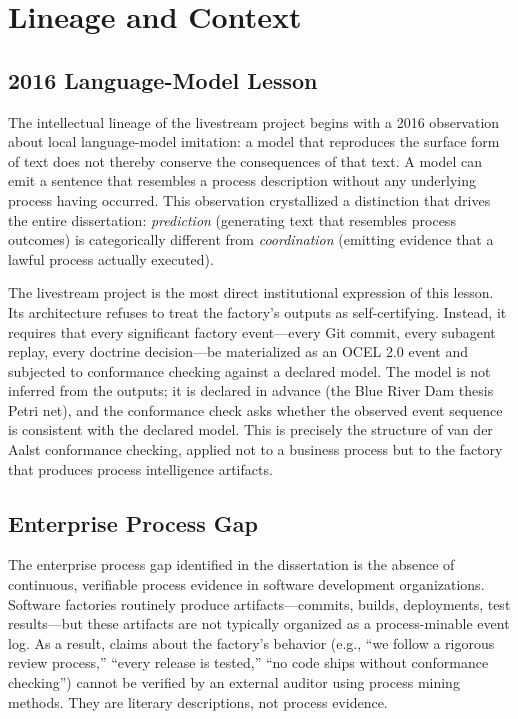 
\section{Lineage and Context}
\label{sec:livestream-lineage}

\subsection{2016 Language-Model Lesson}
\label{sec:livestream-lineage-2016}

The intellectual lineage of the livestream project begins with a 2016 observation
about local language-model imitation: a model that reproduces the surface form of
text does not thereby conserve the consequences of that text. A model can emit a
sentence that resembles a process description without any underlying process having
occurred. This observation crystallized a distinction that drives the entire
dissertation: \emph{prediction} (generating text that resembles process outcomes)
is categorically different from \emph{coordination} (emitting evidence that a
lawful process actually executed).

The livestream project is the most direct institutional expression of this lesson.
Its architecture refuses to treat the factory's outputs as self-certifying. Instead,
it requires that every significant factory event---every Git commit, every subagent
replay, every doctrine decision---be materialized as an OCEL 2.0 event and subjected
to conformance checking against a declared model. The model is not inferred from
the outputs; it is declared in advance (the Blue River Dam thesis Petri net), and
the conformance check asks whether the observed event sequence is consistent with
the declared model. This is precisely the structure of van der Aalst conformance
checking, applied not to a business process but to the factory that produces
process intelligence artifacts.

\subsection{Enterprise Process Gap}
\label{sec:livestream-lineage-enterprise-gap}

The enterprise process gap identified in the dissertation is the absence of
continuous, verifiable process evidence in software development organizations.
Software factories routinely produce artifacts---commits, builds, deployments,
test results---but these artifacts are not typically organized as a process-minable
event log. As a result, claims about the factory's behavior (e.g., ``we follow
a rigorous review process,'' ``every release is tested,'' ``no code ships without
conformance checking'') cannot be verified by an external auditor using process
mining methods. They are literary descriptions, not process evidence.

